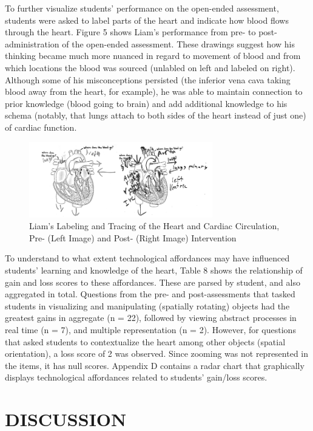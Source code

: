 \documentclass[11.5pt]{sig-alternate} %
\begin{document}
\begin{large}
To further visualize students’ performance on the open-ended assessment, students were asked to label parts of the heart and indicate how blood flows through the heart. Figure 5 shows Liam’s performance from pre- to post-administration of the open-ended assessment. These drawings suggest how his thinking became much more nuanced in regard to movement of blood and from which locations the blood was sourced (unlabled on left and labeled on right). Although some of his misconceptions persisted (the inferior vena cava taking blood away from the heart, for example), he was able to maintain connection to prior knowledge (blood going to brain) and add additional knowledge to his schema (notably, that lungs attach to both sides of the heart instead of just one) of cardiac function.

\begin{figure}[h]
    \centering
    \includegraphics[width=8cm]{Figure 5.png}
    \caption{Liam’s Labeling and Tracing of the Heart and Cardiac Circulation, Pre- (Left Image) and Post- (Right Image) Intervention}
\end{figure}

To understand to what extent technological affordances may have influenced students’ learning and knowledge of the heart, Table 8 shows the relationship of gain and loss scores to these affordances. These are parsed by student, and also aggregated in total. Questions from the pre- and post-assessments that tasked students in visualizing and manipulating (spatially rotating) objects had the greatest gains in aggregate (n = 22), followed by viewing abstract processes in real time (n = 7), and multiple representation (n = 2).  However, for questions that asked students to contextualize the heart among other objects (spatial orientation), a loss score of 2 was observed. Since zooming was not represented in the items, it has null scores. Appendix D contains a radar chart that graphically displays technological affordances related to students’ gain/loss scores.

\section*{DISCUSSION}


\end{large}
\end{document}
